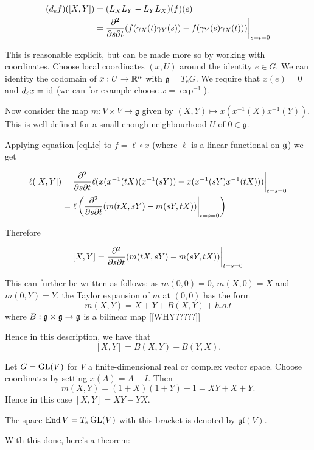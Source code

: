 \documentclass[11pt, english]{article}
\begin{document}
\begin{align}
(d_ef)([X,Y]) &= (L_X L_Y - L_Y L_X)(f)(e) \nonumber \\
&= \restr{
\frac{\partial^2}{\partial s \partial t} (f(\gamma_X(t)\gamma_Y(s))-f(\gamma_Y(s)\gamma_X(t)))}{s=t=0} \label{eqLie}
\end{align}

This is reasonable explicit, but can be made more so by working with coordinates. Choose local coordinates $(x,U)$ around the identity $e \in G$. We can identity the codomain of $x:U \to \mathbb{R}^n$ with $\mathfrak g=T_eG$. We require that $x(e)=0$ and $d_ex = \text{id}$ (we can for example choose $x = \exp^{-1}$). 

Now consider the map $m:V \times V \to \mathfrak g$ given by $(X,Y) \mapsto x(x^{-1}(X)x^{-1}(Y))$. This is well-defined for a small enough neighbourhood $U$ of $0 \in \mathfrak g$. 

Applying equation \eqref{eqLie} to $f = \ell \circ x$ (where $\ell$ is a linear functional on $\mathfrak g$) we get 

\begin{align*}
\ell([X,Y]) &= \restr{\frac{\partial^2}{\partial s \partial t} \ell(x(x^{-1}(tX)(x^{-1}(sY))-x(x^{-1}(sY)x^{-1}(tX)))}{t=s=0} \\
&= \ell \left(\restr{\frac{\partial^2}{\partial s \partial t} (m(tX,sY) - m(sY,tX))}{t=s=0} \right)
\end{align*}

Therefore 

$$
[X,Y] = \restr{\frac{\partial^2}{\partial s \partial t} (m(tX,sY) - m(sY,tX))}{t=s=0} 
$$

This can further be written as follows: as $m(0,0)=0$, $m(X,0)=X$ and $m(0,Y)=Y$, the Taylor expansion of $m$ at $(0,0)$ has the form
$$
m(X,Y) = X+Y + B(X,Y) + h.o.t
$$
where $B: \mathfrak g \times \mathfrak g \to \mathfrak g$ is a bilinear map [[WHY?????]] 

Hence in this description, we have that
$$
[X,Y] = B(X,Y) - B(Y,X).
$$

\begin{example}
Let $G= \operatorname{GL}(V)$ for $V$ a finite-dimensional real or complex vector space. Choose coordinates by setting $x(A) = A-I$. Then
$$
m(X,Y) = (1+X)(1+Y)-1  = XY+ X+Y.
$$
Hence in this case $[X,Y]= XY-YX$. 
\end{example}

The space $\operatorname{End} V=T_e \operatorname{GL}(V)$ with this bracket is denoted by $\mathfrak {gl}(V)$. 

With this done, here's a theorem:
\end{document}
